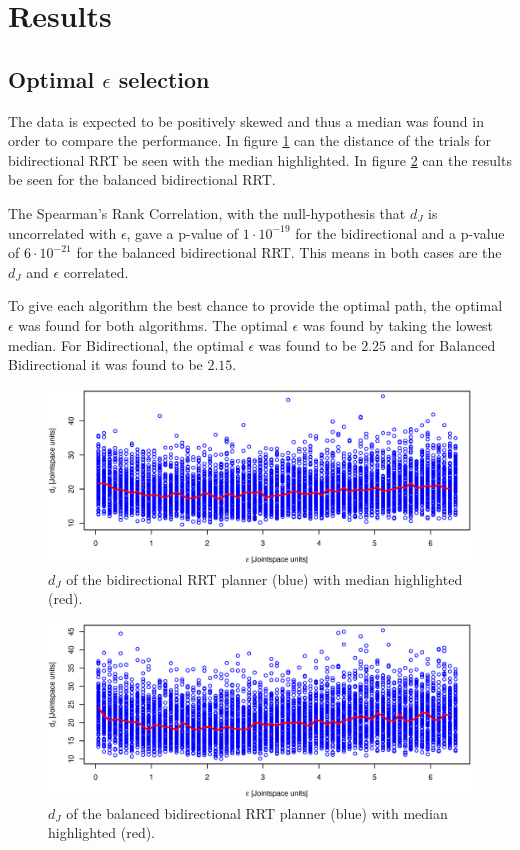 \section{Results} 
\subsection{Optimal \(\epsilon\) selection}

The data is expected to be positively skewed and thus a median was found in order to compare the performance.
In figure \ref{fig:bidir_correlated} can the distance of the trials for bidirectional RRT be seen with the median highlighted.
In figure \ref{fig:balanced_correlated} can the results be seen for the balanced bidirectional RRT.

The Spearman's Rank Correlation, with the null-hypothesis that \(d_J\) is uncorrelated with \(\epsilon\),
gave a p-value of \(1\cdot 10^{-19}\) for the bidirectional and a p-value of \(6\cdot 10^{-21}\) for the balanced bidirectional RRT.
This means in both cases are the \(d_J\) and \(\epsilon\) correlated.

To give each algorithm the best chance to provide the optimal path, the optimal \(\epsilon\) was found for both algorithms.
The optimal \(\epsilon\) was found by taking the lowest median.
For Bidirectional, the optimal \(\epsilon\) was found to be \(2.25\) and for Balanced Bidirectional it was found to be \(2.15\).

\begin{figure}[H]
 \centering
 \includegraphics[width=\figsize]{graphics/bidirectional_correlation}
 \caption{\(d_J\) of the bidirectional RRT planner (blue) with median highlighted (red).}
 \label{fig:bidir_correlated}
\end{figure}

\begin{figure}[H]
 \centering
 \includegraphics[width=\figsize]{graphics/balanced_correlation}
 \caption{\(d_J\) of the balanced bidirectional RRT planner (blue) with median highlighted (red).}
 \label{fig:balanced_correlated}
\end{figure}

